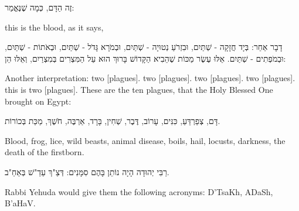 
זֶה הַדָּם, כְּמָה שֶׁנֶּאֱמַר: 

\begin{english}
 this is the blood, as it says, 
\end{english}

\vspace{2em}


דָבָר אַחֵר: בְּיָד חֲזָקָה - שְׁתַּיִם, וּבִזְרֹעַ נְטוּיָה - שְׁתַּיִם, וּבְמֹרָא גָּדֹל - שְׁתַּיִם, וּבְאֹתוֹת - שְׁתַּיִם, וּבְמֹפְתִים - שְׁתַּיִם. אֵלּוּ עֶשֶׂר מַכּוֹת שֶׁהֵבִיא הַקָּדוֹשׁ בָּרוּךְ הוּא עַל הַמִּצְרִים בְּמִצְרַיִם, וְאֵלּוּ הֵן:



\begin{english}
Another interpretation:  two [plagues].  two [plagues].  two [plagues].  two [plagues].  this is two [plagues]. These are the ten plagues, that the Holy Blessed One brought on Egypt:
\end{english}

\break

דָּם, צְפַרְדֵּעַ, כִּנִּים, עָרוֹב, דֶּבֶר, שְׁחִין, בָּרָד, אַרְבֶּה, חֹשֶׁךְ, מַכַּת בְּכוֹרוֹת.

\begin{english}
Blood, frog, lice, wild beasts, animal disease, boils, hail, locusts, darkness, the death of the firstborn.
\end{english}

רַבִּי יְהוּדָה הָיָה נוֹתֵן בָּהֶם סִמָּנִים: דְּצַ"ךְ עַדַ"שׁ בְּאַחַ"ב.

\begin{english}
Rabbi Yehuda would give them the following acronyms: D'TsaKh, ADaSh, B'aHaV.
\end{english}

\vspace{1em}

